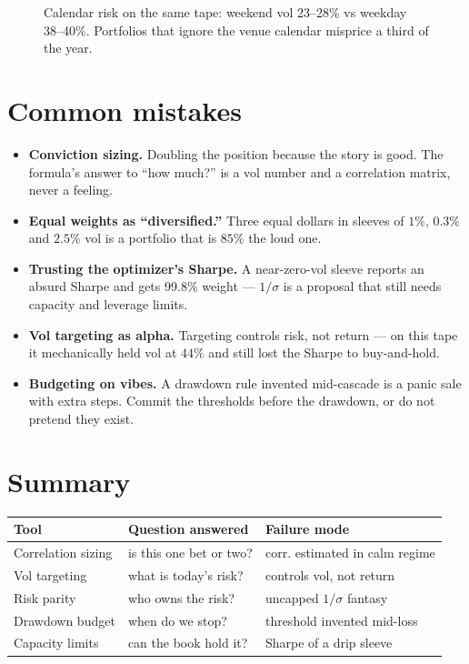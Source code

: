 \begin{figure}[htbp]\centering

\caption{Calendar risk on the same tape: weekend vol 23--28\%
vs weekday 38--40\%. Portfolios that ignore the venue calendar
misprice a third of the year.}
\label{fig:wkvol}
\end{figure}

\section{Common mistakes}
\begin{itemize}
\item \textbf{Conviction sizing.} Doubling the position because
the story is good. The formula's answer to ``how much?'' is a
vol number and a correlation matrix, never a feeling.
\item \textbf{Equal weights as ``diversified.''} Three equal
dollars in sleeves of $1\%$, $0.3\%$ and $2.5\%$ vol is a
portfolio that is $85\%$ the loud one.
\item \textbf{Trusting the optimizer's Sharpe.} A near-zero-vol
sleeve reports an absurd Sharpe and gets 99.8\% weight ---
$1/\sigma$ is a proposal that still needs capacity and leverage
limits.
\item \textbf{Vol targeting as alpha.} Targeting controls risk,
not return --- on this tape it mechanically held vol at $44\%$
and still lost the Sharpe to buy-and-hold.
\item \textbf{Budgeting on vibes.} A drawdown rule invented
mid-cascade is a panic sale with extra steps. Commit the
thresholds before the drawdown, or do not pretend they exist.
\end{itemize}

\section*{Summary}
\begin{center}
\begin{tabular}{@{}lll@{}}
\toprule
Tool & Question answered & Failure mode \\
\midrule
Correlation sizing & is this one bet or two? & corr. estimated in calm regime \\
Vol targeting & what is today's risk? & controls vol, not return \\
Risk parity & who owns the risk? & uncapped $1/\sigma$ fantasy \\
Drawdown budget & when do we stop? & threshold invented mid-loss \\
Capacity limits & can the book hold it? & Sharpe of a drip sleeve \\
\bottomrule
\end{tabular}
\end{center}

